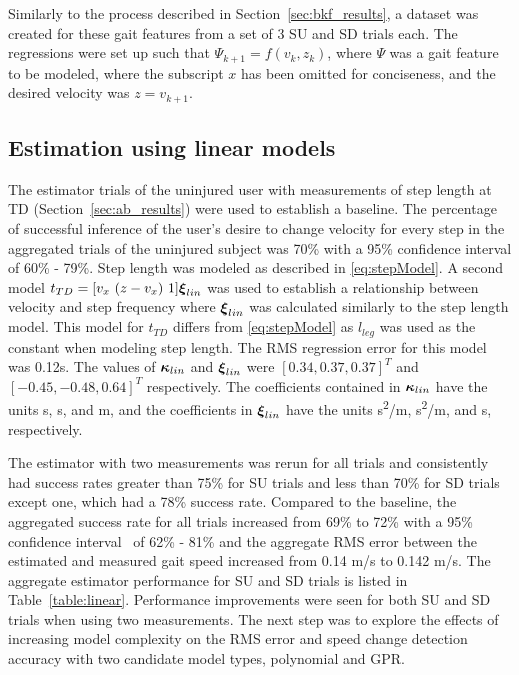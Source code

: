 Similarly to the process described in Section~\ref{sec:bkf_results}, a dataset was created for these gait features from a set of 3 SU and SD trials each. The regressions were set up such that $ \Psi_{k+1} = f(v_k,z_k) $, where $ \Psi $ was a gait feature to be modeled, where the subscript $ x $ has been omitted for conciseness, and the desired velocity was $ z = v_{k+1} $. 

\subsection{Estimation using linear models}\label{sec:linear}

The estimator trials of the uninjured user with measurements of step length at TD (Section~\ref{sec:ab_results}) were used to establish a baseline. The percentage of successful inference of the user's desire to change velocity for every step in the aggregated trials of the uninjured subject was 70\% with a 95\% confidence interval of 60\% - 79\%. Step length was modeled as described in \eqref{eq:stepModel}. A second model $t_{TD} =  [v_x\ (z - v_x)\ 1] \boldsymbol{\xi}_{lin}$ was used to establish a relationship between velocity and step frequency where $ \boldsymbol{\xi}_{lin} $ was calculated similarly to the step length model. This model for $ t_{TD} $ differs from \eqref{eq:stepModel} as $ l_{leg} $ was used as the constant when modeling step length. The RMS regression error for this model was 0.12s. The values of $ \boldsymbol{\kappa}_{lin} $ and $ \boldsymbol{\xi}_{lin} $ were $[0.34 ,0.37 ,0.37]^T$ and $ [-0.45 ,-0.48 ,0.64]^T $ respectively. The coefficients contained in $ \boldsymbol{\kappa}_{lin} $ have the units s, s, and m, and the coefficients in $ \boldsymbol{\xi}_{lin} $ have the units s\textsuperscript{2}/m, s\textsuperscript{2}/m, and s, respectively.

The estimator with two measurements was rerun for all trials and consistently had success rates greater than 75\% for SU trials and less than 70\% for SD trials except one, which had a 78\% success rate. Compared to the baseline, the aggregated success rate for all trials increased from 69\% to  72\% with a 95\% confidence interval~\cite{brown2001interval} of 62\% - 81\% and the aggregate RMS error between the estimated and measured gait speed increased from 0.14 m/s to 0.142 m/s. The aggregate estimator performance for SU and SD trials is listed in Table~\ref{table:linear}. Performance improvements were seen for both SU and SD trials when using two measurements. The next step was to explore the effects of increasing model complexity on the RMS error and speed change detection accuracy with two candidate model types, polynomial and GPR.

